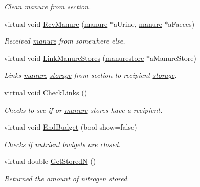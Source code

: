 \begin{DoxyCompactItemize}
\begin{DoxyCompactList}\small\item\em Clean \hyperlink{classmanure}{manure} from section. \item\end{DoxyCompactList}\item 
virtual void \hyperlink{classanimal_section_a37bd72c4e77137793f050339384e9486}{RcvManure} (\hyperlink{classmanure}{manure} $\ast$aUrine, \hyperlink{classmanure}{manure} $\ast$aFaeces)
\begin{DoxyCompactList}\small\item\em Received \hyperlink{classmanure}{manure} from somewhere else. \item\end{DoxyCompactList}\item 
virtual void \hyperlink{classanimal_section_afc851db54dc233202416093ecc3049a5}{LinkManureStores} (\hyperlink{classmanurestore}{manurestore} $\ast$aManureStore)
\begin{DoxyCompactList}\small\item\em Links \hyperlink{classmanure}{manure} \hyperlink{classstorage}{storage} from section to recipient \hyperlink{classstorage}{storage}. \item\end{DoxyCompactList}\item 
virtual void \hyperlink{classanimal_section_a4d179a53e1e930f22e3038edbc8087df}{CheckLinks} ()
\begin{DoxyCompactList}\small\item\em Checks to see if or \hyperlink{classmanure}{manure} stores have a recipient. \item\end{DoxyCompactList}\item 
virtual void \hyperlink{classanimal_section_afeb7aebaaa99c762e3d1fc61bb47f03b}{EndBudget} (bool show=false)
\begin{DoxyCompactList}\small\item\em Checks if nutrient budgets are closed. \item\end{DoxyCompactList}\item 
virtual double \hyperlink{classanimal_section_ab67599c405210473dd2db71f28982318}{GetStoredN} ()
\begin{DoxyCompactList}\small\item\em Returned the amount of \hyperlink{classnitrogen}{nitrogen} stored. \item\end{DoxyCompactList}\item 

\end{DoxyCompactItemize}
